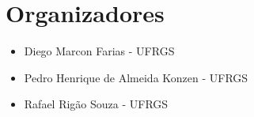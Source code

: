 
\chapter*{Organizadores}

\begin{itemize}
\item[] Diego Marcon Farias - UFRGS
\item[] Pedro Henrique de Almeida Konzen - UFRGS
\item[] Rafael Rigão Souza - UFRGS
\end{itemize}
